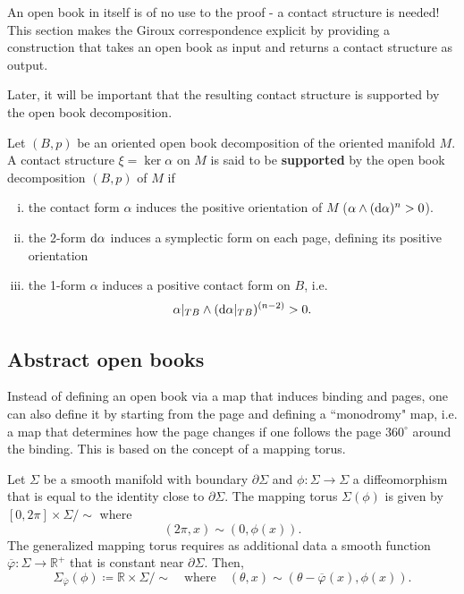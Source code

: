 An open book in itself is of no use to the proof - a contact structure is needed! 
This section makes the Giroux correspondence explicit by providing a construction that takes an open book as input
and returns a contact structure as output.

Later, it will be important that the resulting contact structure is supported by the open book decomposition.
\begin{definition}\label{def:support}
    Let $(B,p)$ be an oriented open book decomposition of the oriented manifold $M$.
    A contact structure $\xi = \ker \alpha$ on $M$ is said to be \textbf{supported} by the open book decomposition $(B,p)$ of $M$ if
    \begin{enumerate}[(i)]
        \item the contact form $\alpha$ induces the positive orientation of $M$ ($\alpha \wedge (\mathrm{d} \alpha)^n > 0$).
        \item the 2-form $\mathrm{d} \alpha$ induces a symplectic form on each page, defining its positive orientation
        \item the 1-form $\alpha$ induces a positive contact form on $B$, i.e. 
        \[ 
            \alpha|_{TB} \wedge (\mathrm{d} \alpha|_{TB})^{(n-2)} > 0.
        \]
    \end{enumerate}
\end{definition}



\subsection*{Abstract open books}
Instead of defining an open book via a map that induces binding and pages, one can also define it by starting from the page and defining
a ``monodromy" map, i.e. a map that determines how the page changes if one follows the page $360^\circ$ around the binding.
This is based on the concept of a mapping torus.

\begin{definition}
    Let $\Sigma$ be a smooth manifold with boundary $\partial \Sigma$
    and $\phi: \Sigma \to \Sigma$ a diffeomorphism that is equal to the identity close to $\partial \Sigma$.
    The mapping torus $\Sigma(\phi)$ is given by
     $[0,2\pi] \times \Sigma/\sim$ where
     \[
        (2\pi, x) \sim (0, \phi(x)). 
     \]
     The generalized mapping torus requires as additional data a smooth function $\overline{\varphi}: \Sigma \to \mathbb R^+$ that is constant near $\partial \Sigma$. Then,
     \[
        \Sigma_{\overline{\varphi}}(\phi) \coloneqq \mathbb R \times \Sigma/\sim \quad \text{where} \quad  (\theta, x) \sim (\theta - \overline{\varphi}(x), \phi(x)).
     \]
\end{definition}

